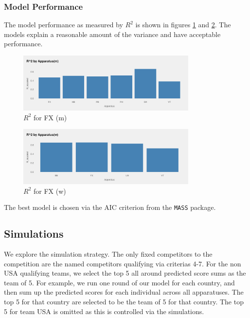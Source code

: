\documentclass{article}
\begin{document}
\subsubsection{Model Performance}
The model performance as measured by $R^2$ is shown in figures \ref{fig:m_r2}
and \ref{fig:w_r2}. The models explain a reasonable amount of the variance and 
have acceptable performance.

\begin{figure}[H]
    \centering
    \includegraphics[width=0.8\textwidth]{../plots/m_r2.png}
    \caption{$R^2$ for FX (m)}
    \label{fig:m_r2}
\end{figure}

\begin{figure}[H]
    \centering
    \includegraphics[width=0.8\textwidth]{../plots/w_r2.png}
    \caption{$R^2$ for FX (w)}
    \label{fig:w_r2}
\end{figure}
\noindent The best model is chosen via the AIC criterion from the \texttt{MASS} package.

\subsection{Simulations}

We explore the simulation strategy. The only fixed competitors to the competition 
are the named competitors qualifying via criterias 4-7. For the non USA qualifying teams, 
we select the top 5 all around predicted score sums as the team of 5. For example, 
we run one round of our model for each country, and then sum up the predicted scores 
for each individual across all apparatuses. The top 5 for that country are selected to 
be the team of 5 for that country. The top 5 for team USA is omitted as this 
is controlled via the simulations.
\end{document}
